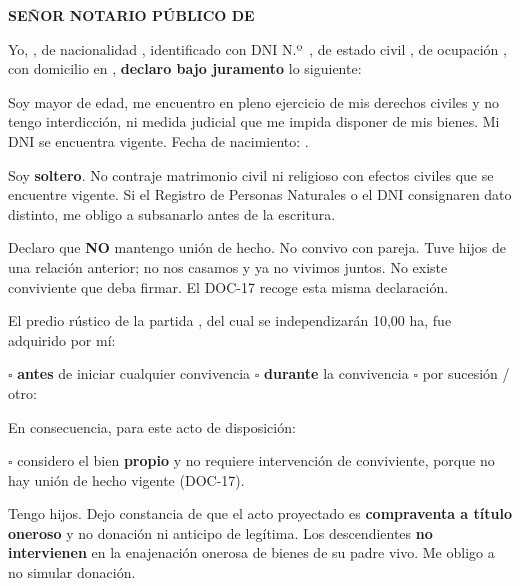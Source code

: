 \documentclass[12pt,a4paper]{article}
\begin{document}


\noindent \textbf{SEÑOR NOTARIO PÚBLICO DE \MakeUppercase{\NotariaCiudad}}

\vspace{0.2em}
\noindent Yo, \textbf{\VendedorNombreCompleto}, de nacionalidad \VendedorNacionalidad, identificado con DNI N.º\ \textbf{\VendedorDNI}, de estado civil \textbf{\VendedorEstadoCivil}, de ocupación \VendedorOcupacion, con domicilio en \VendedorDomicilio, \textbf{declaro bajo juramento} lo siguiente:

Soy mayor de edad, me encuentro en pleno ejercicio de mis derechos civiles y no tengo interdicción, ni medida judicial que me impida disponer de mis bienes. Mi DNI se encuentra vigente. Fecha de nacimiento: \VendedorFechaNac.

Soy \textbf{soltero}. No contraje matrimonio civil ni religioso con efectos civiles que se encuentre vigente. Si el Registro de Personas Naturales o el DNI consignaren dato distinto, me obligo a subsanarlo antes de la escritura.

Declaro que \textbf{NO} mantengo unión de hecho. No convivo con pareja. Tuve hijos de una relación anterior; no nos casamos y ya no vivimos juntos. No existe conviviente que deba firmar. El DOC-17 recoge esta misma declaración.

El predio rústico de la partida \PartidaMatriz, del cual se independizarán 10,00 ha, fue adquirido por mí:

\vspace{0.2em}
\noindent $\square$ \textbf{antes} de iniciar cualquier convivencia \quad $\square$ \textbf{durante} la convivencia \quad $\square$ por sucesión / otro: \linea[4.2cm]

\vspace{0.25em}
\noindent En consecuencia, para este acto de disposición:

\vspace{0.15em}
\noindent $\square$ considero el bien \textbf{propio} y no requiere intervención de conviviente, porque no hay unión de hecho vigente (DOC-17).

Tengo hijos. Dejo constancia de que el acto proyectado es \textbf{compraventa a título oneroso} y no donación ni anticipo de legítima. Los descendientes \textbf{no intervienen} en la enajenación onerosa de bienes de su padre vivo. Me obligo a no simular donación.
\end{document}

